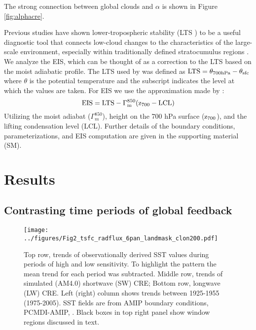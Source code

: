 The strong connection between global clouds and $\alpha$ is shown in Figure \ref{fig:alphacre}.                  
            
Previous studies have shown lower-tropospheric stability (LTS ) to be a useful diagnostic tool that connects low-cloud changes to the characteristics of the large-scale environment, especially within traditionally defined stratocumulus regions \citep{Klein_Hartmann_1993,Wood_Bretherton_2006, Medeiros_etal_2008, Webb_etal_2015}.               
We analyze the EIS, which can be thought of as a correction to the LTS based on the moist adiabatic profile.  The LTS used by \citet{Klein_Hartmann_1993} was defined as $\rm{LTS}=\theta_{700 hPa}-\theta_{sfc}$ where $\theta$ is the potential temperature and the subscript indicates the level at which the values are taken.   
For EIS we use 
the approximation made by \citet{Wood_Bretherton_2006}:
\begin{equation}
    \rm{EIS} = \rm{LTS} - \Gamma^{850}_m (z_{700}-\rm{LCL})
\end{equation}
Utilizing the moist adiabat ($\Gamma_m^{850}$), height on the 700 hPa surface ($\rm{z_{700}}$), and the lifting condensation level (LCL).  
  Further details of the boundary conditions, parameterizations, and EIS computation are given in the supporting material (SM).  

\section{Results}
\subsection{Contrasting time periods of global feedback}

\begin{figure}
  \texttt{[image: ../figures/Fig2\_tsfc\_radflux\_6pan\_landmask\_clon200.pdf]}
  \caption{Top row, trends of observationally derived SST values during periods of high and low sensitivity.  To highlight the pattern the mean trend for each period was subtracted.
Middle row, trends of simulated (AM4.0) shortwave (SW) CRE; Bottom row, longwave (LW) CRE.  Left (right) column shows trends between 1925-1955 (1975-2005).  SST fields are from AMIP boundary conditions, PCMDI-AMIP, \citet{Taylor_etal_2000}.  Black boxes in top right panel show window regions discussed in text.}
  \label{fig:am4tsfc}
\end{figure}

